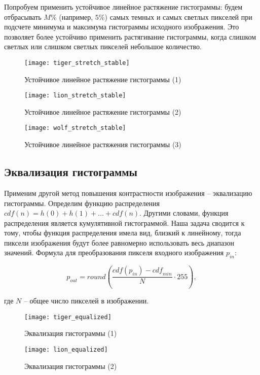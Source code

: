 Попробуем применить устойчивое линейное растяжение гистограммы: будем отбрасывать $M\%$ (например, $5\%$) самых темных и самых светлых пикселей при подсчете минимума и максимума гистограммы исходного изображения. Это позволяет более устойчиво применить растягивание гистограммы, когда слишком светлых или слишком светлых пикселей небольшое количество.

\begin{figure}[H]
	\centering
	\texttt{[image: tiger\_stretch\_stable]}
	\caption{Устойчивое линейное растяжение гистограммы (1)}
\end{figure}

\begin{figure}[H]
	\centering
	\texttt{[image: lion\_stretch\_stable]}
	\caption{Устойчивое линейное растяжение гистограммы (2)}
\end{figure}

\begin{figure}[H]
	\centering
	\texttt{[image: wolf\_stretch\_stable]}
	\caption{Устойчивое линейное растяжения гистограммы (3)}
\end{figure}

\subsection{Эквализация гистограммы}

Применим другой метод повышения контрастности изображения -- эквализацию гистограммы. Определим функцию распределения $\mathit{cdf}(n) = h(0) + h(1) + ... + \mathit{cdf}(n)$. Другими словами, функция распределения является кумулятивной гистограммой. Наша задача сводится к тому, чтобы функция распределения имела вид, близкий к линейному, тогда пиксели изображения будут более равномерно использовать весь диапазон значений. Формула для преобразования пикселя входного изображения $p_{in}$:

$$
p_{out} = \mathit{round} \left( \frac{\mathit{cdf}(p_{in}) - \mathit{cdf}_{min}}{N} \cdot 255 \right),
$$

где $N$ -- общее число пикселей в изображении.

\begin{figure}[H]
	\centering
	\texttt{[image: tiger\_equalized]}
	\caption{Эквализация гистограммы (1)}
\end{figure}

\begin{figure}[H]
	\centering
	\texttt{[image: lion\_equalized]}
	\caption{Эквализация гистограммы (2)}
\end{figure}

